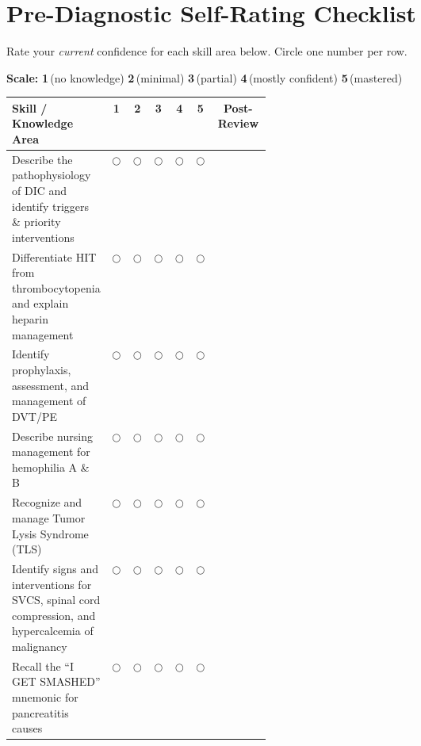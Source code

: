 \documentclass[11pt,letterpaper]{article}
\newcommand{\confscale}{%
  \hfill
  \textbf{1}\,\small(no knowledge)\normalsize\quad
  \textbf{2}\,\small(minimal)\normalsize\quad
  \textbf{3}\,\small(partial)\normalsize\quad
  \textbf{4}\,\small(mostly confident)\normalsize\quad
  \textbf{5}\,\small(mastered)\normalsize}
\begin{document}
\tableofcontents
\newpage

\section{Pre-Diagnostic Self-Rating Checklist}

\begin{selfbox}
Rate your \emph{current} confidence for each skill area below.  Circle one number per row.

\vspace{0.2cm}
\textbf{Scale:}\confscale

\vspace{0.4cm}
\begin{center}
\renewcommand{\arraystretch}{1.55}
\begin{longtable}{|p{0.38\linewidth}|c|c|c|c|c|c|}
\hline
\textbf{Skill / Knowledge Area} & \textbf{1} & \textbf{2} & \textbf{3} & \textbf{4} & \textbf{5}
  & \parbox[c]{1.4cm}{\centering\textbf{Post-\\Review}} \\
\hline
\endhead
Describe the pathophysiology of DIC and identify triggers \& priority interventions & $\bigcirc$ & $\bigcirc$ & $\bigcirc$ & $\bigcirc$ & $\bigcirc$ & \\
\hline
Differentiate HIT from thrombocytopenia and explain heparin management & $\bigcirc$ & $\bigcirc$ & $\bigcirc$ & $\bigcirc$ & $\bigcirc$ & \\
\hline
Identify prophylaxis, assessment, and management of DVT/PE & $\bigcirc$ & $\bigcirc$ & $\bigcirc$ & $\bigcirc$ & $\bigcirc$ & \\
\hline
Describe nursing management for hemophilia A \& B & $\bigcirc$ & $\bigcirc$ & $\bigcirc$ & $\bigcirc$ & $\bigcirc$ & \\
\hline
Recognize and manage Tumor Lysis Syndrome (TLS) & $\bigcirc$ & $\bigcirc$ & $\bigcirc$ & $\bigcirc$ & $\bigcirc$ & \\
\hline
Identify signs and interventions for SVCS, spinal cord compression, and hypercalcemia of malignancy & $\bigcirc$ & $\bigcirc$ & $\bigcirc$ & $\bigcirc$ & $\bigcirc$ & \\
\hline
Recall the ``I GET SMASHED'' mnemonic for pancreatitis causes & $\bigcirc$ & $\bigcirc$ & $\bigcirc$ & $\bigcirc$ & $\bigcirc$ & \\

\end{longtable}
\end{center}
\end{selfbox}
\end{document}
